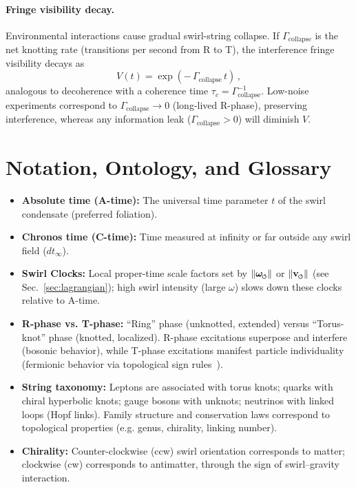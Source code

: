 \documentclass[11pt]{article}
\begin{document}
\paragraph{Fringe visibility decay.}
    Environmental interactions cause gradual swirl-string collapse. If $\Gamma_{\text{collapse}}$ is the net knotting rate (transitions per second from R to T), the interference fringe visibility decays as
    \[
        V(t) = \exp(-\,\Gamma_{\text{collapse}}\,t)\,,
    \]
    analogous to decoherence with a coherence time $\tau_c = \Gamma_{\text{collapse}}^{-1}$. Low-noise experiments correspond to $\Gamma_{\text{collapse}}\to 0$ (long-lived R-phase), preserving interference, whereas any information leak ($\Gamma_{\text{collapse}}>0$) will diminish $V$.

\section{Notation, Ontology, and Glossary}
\label{sec:glossary}
\begin{itemize}
\item \textbf{Absolute time (A-time):} The universal time parameter $t$ of the swirl condensate (preferred foliation).
\item \textbf{Chronos time (C-time):} Time measured at infinity or far outside any swirl field ($dt_\infty$).
\item \textbf{Swirl Clocks:} Local proper-time scale factors set by $\|\omegas\|$ or $\|\vswirl\|$ (see Sec.~\ref{sec:lagrangian}); high swirl intensity (large $\omega$) slows down these clocks relative to A-time.
\item \textbf{R-phase vs. T-phase:} ``Ring'' phase (unknotted, extended) versus ``Torus-knot'' phase (knotted, localized). R-phase excitations superpose and interfere (bosonic behavior), while T-phase excitations manifest particle individuality (fermionic behavior via topological sign rules~\cite{FinkelsteinRubinstein1968}).
\item \textbf{String taxonomy:} Leptons are associated with torus knots; quarks with chiral hyperbolic knots; gauge bosons with unknots; neutrinos with linked loops (Hopf links). Family structure and conservation laws correspond to topological properties (e.g. genus, chirality, linking number).
\item \textbf{Chirality:} Counter-clockwise (ccw) swirl orientation corresponds to matter; clockwise (cw) corresponds to antimatter, through the sign of swirl–gravity interaction.
\end{itemize}
\end{document}

